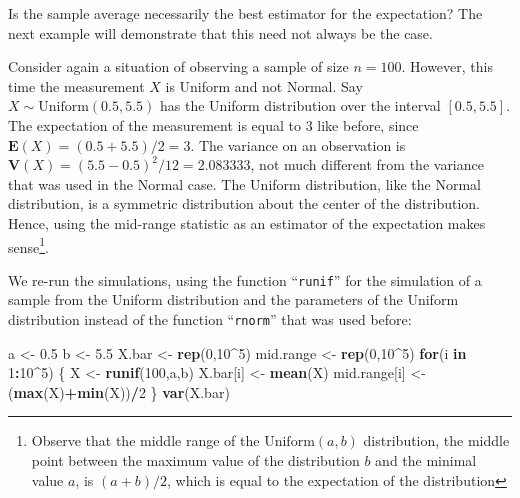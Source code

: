\documentclass[
]{krantz}
\makeatletter
\newenvironment{Shaded}{\begin{snugshade}}{\end{snugshade}}
\newcommand{\ControlFlowTok}[1]{\textcolor[rgb]{0.13,0.29,0.53}{\textbf{#1}}}
\newcommand{\DecValTok}[1]{\textcolor[rgb]{0.00,0.00,0.81}{#1}}
\newcommand{\FloatTok}[1]{\textcolor[rgb]{0.00,0.00,0.81}{#1}}
\newcommand{\KeywordTok}[1]{\textcolor[rgb]{0.13,0.29,0.53}{\textbf{#1}}}
\newcommand{\NormalTok}[1]{#1}
\newcommand{\OperatorTok}[1]{\textcolor[rgb]{0.81,0.36,0.00}{\textbf{#1}}}
\newcommand{\StringTok}[1]{\textcolor[rgb]{0.31,0.60,0.02}{#1}}
\newcommand{\Expec}{\mathbf{E}}
\newcommand{\Var}{\mathbf{V}}
\newenvironment{kframe}{%
\medskip{}
\setlength{\fboxsep}{.8em}
 \def\at@end@of@kframe{}%
 \ifinner\ifhmode%
  \def\at@end@of@kframe{\end{minipage}}%
  \begin{minipage}{\columnwidth}%
 \fi\fi%
 \def\FrameCommand##1{\hskip\@totalleftmargin \hskip-\fboxsep
 \colorbox{shadecolor}{##1}\hskip-\fboxsep
     \hskip-\linewidth \hskip-\@totalleftmargin \hskip\columnwidth}%
 \MakeFramed {\advance\hsize-\width
   \@totalleftmargin\z@ \linewidth\hsize
   \@setminipage}}%
 {\par\unskip\endMakeFramed%
 \at@end@of@kframe}
\renewenvironment{Shaded}{\begin{kframe}}{\end{kframe}}
\theoremstyle{definition}
\theoremstyle{definition}
\theoremstyle{definition}
\theoremstyle{remark}
\makeatother
\begin{document}
Is the sample average necessarily the best estimator for the
expectation? The next example will demonstrate that this need not always
be the case.

Consider again a situation of observing a sample of size \(n=100\).
However, this time the measurement \(X\) is Uniform and not Normal. Say
\(X \sim \mathrm{Uniform}(0.5,5.5)\) has the Uniform distribution over the
interval \([0.5, 5.5]\). The expectation of the measurement is equal to 3
like before, since \(\Expec(X) = (0.5+5.5)/2 = 3\). The variance on an
observation is \(\Var(X) = (5.5 - 0.5)^2/12 = 2.083333\), not much
different from the variance that was used in the Normal case. The
Uniform distribution, like the Normal distribution, is a symmetric
distribution about the center of the distribution. Hence, using the
mid-range statistic as an estimator of the expectation makes sense\footnote{Observe that the middle range of the \(\mathrm{Uniform}(a,b)\)
  distribution, the middle point between the maximum value of the
  distribution \(b\) and the minimal value \(a\), is \((a+b)/2\), which is
  equal to the expectation of the distribution}.

We re-run the simulations, using the function ``\texttt{runif}'' for the
simulation of a sample from the Uniform distribution and the parameters
of the Uniform distribution instead of the function ``\texttt{rnorm}'' that was
used before:

\begin{Shaded}
\begin{Highlighting}[]
\NormalTok{a <-}\StringTok{ }\FloatTok{0.5}
\NormalTok{b <-}\StringTok{ }\FloatTok{5.5}
\NormalTok{X.bar <-}\StringTok{ }\KeywordTok{rep}\NormalTok{(}\DecValTok{0}\NormalTok{,}\DecValTok{10}\OperatorTok{^}\DecValTok{5}\NormalTok{)}
\NormalTok{mid.range <-}\StringTok{ }\KeywordTok{rep}\NormalTok{(}\DecValTok{0}\NormalTok{,}\DecValTok{10}\OperatorTok{^}\DecValTok{5}\NormalTok{)}
\ControlFlowTok{for}\NormalTok{(i }\ControlFlowTok{in} \DecValTok{1}\OperatorTok{:}\DecValTok{10}\OperatorTok{^}\DecValTok{5}\NormalTok{) \{}
\NormalTok{  X <-}\StringTok{ }\KeywordTok{runif}\NormalTok{(}\DecValTok{100}\NormalTok{,a,b)}
\NormalTok{  X.bar[i] <-}\StringTok{ }\KeywordTok{mean}\NormalTok{(X)}
\NormalTok{  mid.range[i] <-}\StringTok{ }\NormalTok{(}\KeywordTok{max}\NormalTok{(X)}\OperatorTok{+}\KeywordTok{min}\NormalTok{(X))}\OperatorTok{/}\DecValTok{2}
\NormalTok{\}}
\KeywordTok{var}\NormalTok{(X.bar)}
\end{Highlighting}
\end{Shaded}
\end{document}
